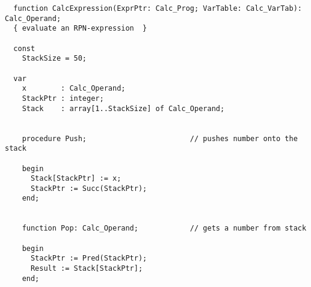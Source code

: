 \begin{refsection}
\begin{lstlisting}
  function CalcExpression(ExprPtr: Calc_Prog; VarTable: Calc_VarTab): Calc_Operand;
  { evaluate an RPN-expression  }

  const
    StackSize = 50;

  var
    x        : Calc_Operand;
    StackPtr : integer;
    Stack    : array[1..StackSize] of Calc_Operand;


    procedure Push;                        // pushes number onto the stack

    begin
      Stack[StackPtr] := x;
      StackPtr := Succ(StackPtr);
    end;


    function Pop: Calc_Operand;            // gets a number from stack

    begin
      StackPtr := Pred(StackPtr);
      Result := Stack[StackPtr];
    end;


\end{lstlisting}
\end{refsection}
